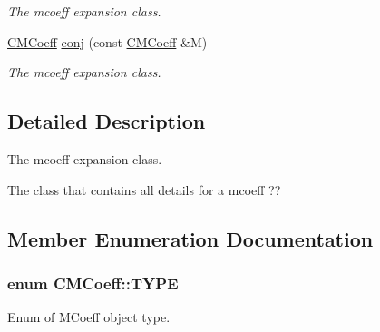 \begin{DoxyCompactItemize}
\begin{DoxyCompactList}\small\item\em The mcoeff expansion class. \end{DoxyCompactList}\item 
\hyperlink{classCMCoeff}{C\-M\-Coeff} \hyperlink{classCMCoeff_a33f855dbf0c86d35853f618e3494db87}{conj} (const \hyperlink{classCMCoeff}{C\-M\-Coeff} \&M)
\begin{DoxyCompactList}\small\item\em The mcoeff expansion class. \end{DoxyCompactList}\end{DoxyCompactItemize}


\subsection{Detailed Description}
The mcoeff expansion class. 

The class that contains all details for a mcoeff ?? 

\subsection{Member Enumeration Documentation}
\hypertarget{classCMCoeff_a0b490eeb5ba86bc1a95ea1c3b2946478}{
\subsubsection[{T\-Y\-P\-E}]{\setlength{\rightskip}{0pt plus 5cm}enum {\bf C\-M\-Coeff\-::\-T\-Y\-P\-E}}}\label{classCMCoeff_a0b490eeb5ba86bc1a95ea1c3b2946478}


Enum of M\-Coeff object type. 

